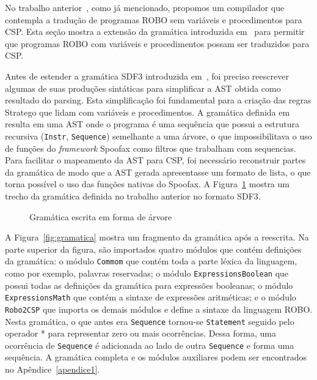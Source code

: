 No trabalho anterior~\cite{nogueira}, como já mencionado, propomos um compilador que contempla a tradução de programas ROBO sem variáveis e procedimentos para CSP. Esta seção mostra a extensão da gramática introduzida em~\cite{nogueira} para permitir que programas ROBO com variáveis e procedimentos possam ser traduzidos para CSP. 

Antes de estender a gramática SDF3 introduzida em~\cite{nogueira}, foi preciso reescrever algumas de suas produções sintáticas para simplificar a AST obtida como resultado do parsing. Esta simplificação foi fundamental para a criação das regras Stratego que lidam com variáveis e procedimentos. A gramática definida em~\cite{nogueira} resulta em uma AST onde o programa é uma sequência que possui a estrutura recursiva (\texttt{Instr}, \texttt{Sequence}) semelhante a uma árvore, o que impossibilitava o uso de funções do \textit{framework} Spoofax como filtros que trabalham com sequencias. Para facilitar o mapeamento da AST para CSP, foi necessário reconstruir partes da gramática de modo que a AST gerada apresentasse um formato de lista, o que torna possível o uso das funções nativas do Spoofax. A Figura~\ref{fig:gramatica_antes} mostra um trecho da gramática definida no trabalho anterior no formato SDF3. 

\begin{figure}[h]
\caption{Gramática escrita em forma de árvore}

\label{fig:gramatica_antes}
\end{figure}

A Figura~\ref{fig:gramatica} mostra um fragmento da gramática após a reescrita. Na parte superior da figura, são importados quatro módulos que contém definições da gramática: o módulo \texttt{Commom} que contém toda a parte léxica da linguagem, como por exemplo, palavras reservadas; o módulo \texttt{ExpressionsBoolean} que possui todas as definições da gramática para expressões booleanas; o módulo \texttt{ExpressionsMath} que contém a sintaxe de expressões aritméticas; e o módulo \texttt{Robo2CSP} que importa os demais módulos e define a sintaxe da linguagem ROBO. Nesta gramática, o que antes era \texttt{Sequence} tornou-se \texttt{Statement} seguido pelo operador * para representar zero ou mais ocorrências. Dessa forma, uma ocorrência de \texttt{Sequence} é adicionada ao lado de outra \texttt{Sequence} e forma uma sequência. A gramática completa e os módulos auxiliares podem ser encontrados no Apêndice~\ref{apendice1}.

